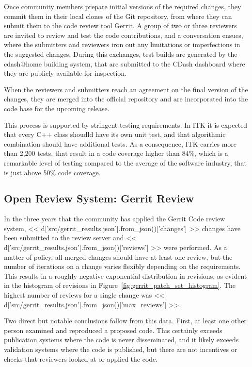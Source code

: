 \documentclass{frontiersENG} %
\begin{document}
Once community members prepare initial versions of the required changes, they
commit them in their local clones of the Git repository, from where they can
submit them to the code review tool Gerrit. A group of two or three reviewers
are invited to review and test the code contributions, and a conversation
ensues, where the submitters and reviewers iron out any limitations or
imperfections in the suggested changes. During this exchanges, test builds are
generated by the cdash@home building system, that are submitted to the CDash
dashboard where they are publicly available for inspection.

When the reviewers and submitters reach an agreement on the final version of
the changes, they are merged into the official repository and are incorporated
into the code base for the upcoming release.

This process is supported by stringent testing requirements. In ITK it is
expected that every C++ class shoudld have its own unit test, and that
algorithmic combination should have additional tests. As a consequence, ITK
carries more than 2,200 tests, that result in a code coverage higher than 84\%,
which is a remarkable level of testing compared to the average of the software
industry, that is just above 50\% code coverage.

\subsection{Open Review System: Gerrit Review}
In the three years that the community has applied the Gerrit Code review
system, << d['src/gerrit_results.json'].from_json()['changes'] >> changes have
been submitted to the review server and
<< d['src/gerrit_results.json'].from_json()['reviews'] >> were performed.
As a matter of policy, all merged changes should have at least one review,
but the number of iterations on a change varies flexibly depending on the
requirements. This results in a roughly negative exponential distribution in
revisions, as evident in the histogram of revisions in
Figure~\ref{fig:gerrit_patch_set_histogram}.  The highest number of reviews
for a single change was
<< d['src/gerrit_results.json'].from_json()['max_reviews'] >>.

Two direct but notable conclusions follow from this data. First, at least one
other person examined and reproduced a proposed code.  This certainly exceeds
publication systems where the code is never disseminated, and it likely
exceeds validation systems where the code is published, but there are not
incentives or checks that reviewers looked at or applied the code.
\end{document}
